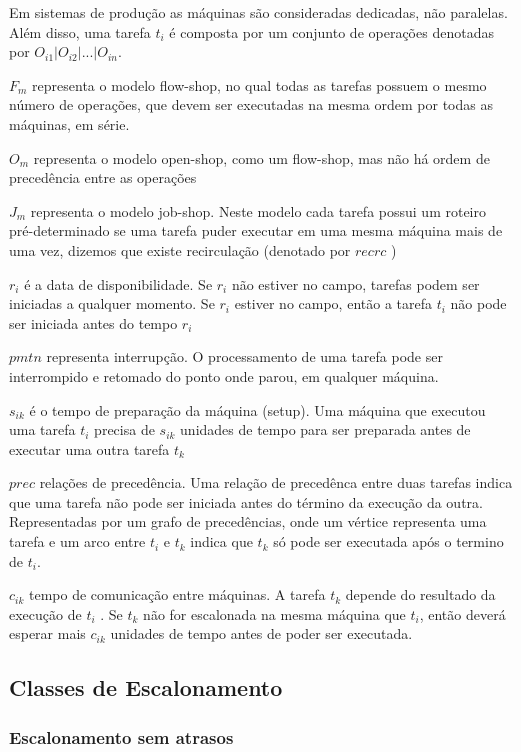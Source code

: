 Em sistemas de produção as máquinas são consideradas dedicadas, não paralelas. Além disso, uma tarefa $t_i$ é composta por um conjunto de operações denotadas por $O_{i1} | O_{i2} | ... | O_{in}$.

$F_m$ representa o modelo flow-shop, no qual todas as tarefas possuem o mesmo
número de operações, que devem ser executadas na mesma ordem por todas as máquinas, em série.

$O_m$ representa o modelo open-shop, como um flow-shop, mas não há ordem
de precedência entre as operações

$J_m$  representa o modelo  job-shop. Neste modelo cada tarefa possui um roteiro pré-determinado se uma tarefa puder executar em uma mesma máquina mais de uma vez, dizemos que existe recirculação (denotado por $recrc$ ) 

$r_i$ é a data de disponibilidade. Se $r_i$ não estiver no campo, tarefas podem ser iniciadas a qualquer momento. Se $r_i$ estiver no campo, então a tarefa $t_i$ não pode ser iniciada antes do tempo $r_i$ 

$pmtn$ representa interrupção. O processamento de uma tarefa pode ser interrompido e retomado do ponto onde parou, em qualquer máquina.

$s_{ik}$ é o tempo de preparação da máquina (setup). Uma máquina que executou uma tarefa $t_i$ precisa de $s_{ik}$ unidades de tempo para ser preparada antes de executar uma outra tarefa $t_k$

$prec$ relações de precedência. Uma relação de precedênca entre duas tarefas indica
que uma tarefa não pode ser iniciada antes do término da execução da outra. Representadas por um grafo de precedências, onde um vértice representa uma tarefa e um arco entre $t_i$ e $t_k$ indica que $t_k$ só pode ser executada após o termino de $t_i$.

$c_{ik}$ tempo de comunicação entre máquinas. A tarefa $t_k$ depende do resultado da execução de $t_i$ . Se $t_k$ não for escalonada na mesma máquina que $t_i$, então deverá esperar mais $c_{ik}$ unidades de tempo antes de poder ser executada.


\subsection{Classes de Escalonamento}

\subsubsection{Escalonamento sem atrasos}

